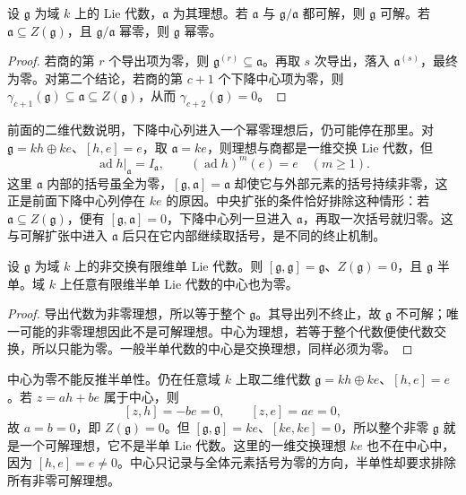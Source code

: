 \begin{proposition}\label{b5:prop:lie-solvable-extension}
	设 \(\mathfrak g\) 为域 \(k\) 上的 Lie 代数，\(\mathfrak a\) 为其理想。若 \(\mathfrak a\) 与 \(\mathfrak g/\mathfrak a\) 都可解，则 \(\mathfrak g\) 可解。若 \(\mathfrak a\subseteq Z(\mathfrak g)\)，且 \(\mathfrak g/\mathfrak a\) 幂零，则 \(\mathfrak g\) 幂零。
\end{proposition}
\begin{proof}
	若商的第 \(r\) 个导出项为零，则 \(\mathfrak g^{(r)}\subseteq\mathfrak a\)。再取 \(s\) 次导出，落入 \(\mathfrak a^{(s)}\)，最终为零。对第二个结论，若商的第 \(c+1\) 个下降中心项为零，则 \(\gamma_{c+1}(\mathfrak g)\subseteq\mathfrak a\subseteq Z(\mathfrak g)\)，从而 \(\gamma_{c+2}(\mathfrak g)=0\)。
\end{proof}
前面的二维代数说明，下降中心列进入一个幂零理想后，仍可能停在那里。对 \(\mathfrak g=kh\oplus ke\)、\([h,e]=e\)，取 \(\mathfrak a=ke\)，则理想与商都是一维交换 Lie 代数，但
\[
	\operatorname{ad}h|_{\mathfrak a}=I_{\mathfrak a},\qquad (\operatorname{ad}h)^m(e)=e\quad(m\geq1).
\]
这里 \(\mathfrak a\) 内部的括号虽全为零，\([\mathfrak g,\mathfrak a]=\mathfrak a\) 却使它与外部元素的括号持续非零，这正是前面下降中心列停在 \(ke\) 的原因。中央扩张的条件恰好排除这种情形：若 \(\mathfrak a\subseteq Z(\mathfrak g)\)，便有 \([\mathfrak g,\mathfrak a]=0\)，下降中心列一旦进入 \(\mathfrak a\)，再取一次括号就归零。这与可解扩张中进入 \(\mathfrak a\) 后只在它内部继续取括号，是不同的终止机制。

\begin{proposition}\label{b5:prop:lie-simple-perfect}
	设 \(\mathfrak g\) 为域 \(k\) 上的非交换有限维单 Lie 代数。则 \([\mathfrak g,\mathfrak g]=\mathfrak g\)、\(Z(\mathfrak g)=0\)，且 \(\mathfrak g\) 半单。域 \(k\) 上任意有限维半单 Lie 代数的中心也为零。
\end{proposition}
\begin{proof}
	导出代数为非零理想，所以等于整个 \(\mathfrak g\)。其导出列不终止，故 \(\mathfrak g\) 不可解；唯一可能的非零理想因此不是可解理想。中心为理想，若等于整个代数便使代数交换，所以只能为零。一般半单代数的中心是交换理想，同样必须为零。
\end{proof}
中心为零不能反推半单性。仍在任意域 \(k\) 上取二维代数 \(\mathfrak g=kh\oplus ke\)、\([h,e]=e\)。若 \(z=ah+be\) 属于中心，则
\[
	[z,h]=-be=0,\qquad [z,e]=ae=0,
\]
故 \(a=b=0\)，即 \(Z(\mathfrak g)=0\)。但 \([\mathfrak g,\mathfrak g]=ke\)、\([ke,ke]=0\)，所以整个非零 \(\mathfrak g\) 就是一个可解理想，它不是半单 Lie 代数。这里的一维交换理想 \(ke\) 也不在中心中，因为 \([h,e]=e\neq0\)。中心只记录与全体元素括号为零的方向，半单性却要求排除所有非零可解理想。

